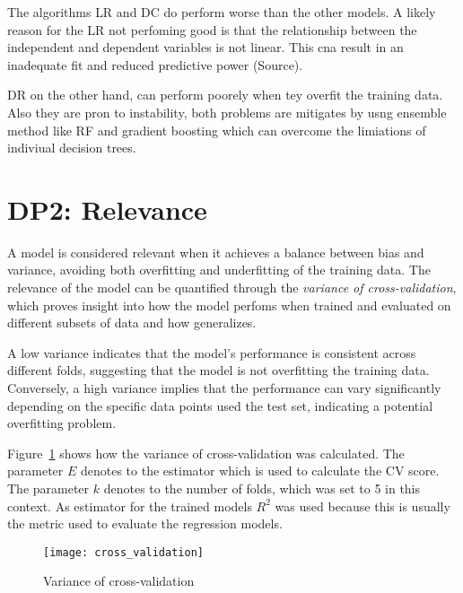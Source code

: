 
The algorithms \ac{LR} and {DC} do perform worse than the other models.
A likely reason for the \ac{LR} not perfoming good is that the relationship between the
independent and dependent variables is not linear. This cna result in an inadequate fit
and reduced predictive power (Source).

\ac{DR} on the other hand, can perform poorely when tey overfit the training data.
Also they are pron to instability, both problems are mitigates by usng ensemble method
like \ac{RF} and gradient boosting which can overcome the limiations of indiviual
decision trees.


\section{DP2: Relevance}\label{sec:relevance}

A model is considered relevant when it achieves a balance between bias and
variance, avoiding
both overfitting and underfitting of the training data.
The relevance of the model can be quantified through the \textit{variance of
cross-validation},
which proves insight into how the model perfoms when trained and evaluated on
different subsets
of data and how generalizes.

A low variance indicates that the model's performance is consistent across
different folds,
suggesting that the model is not overfitting the training data.
Conversely, a high variance implies that the performance can vary
significantly depending on the
specific data points used the test set, indicating a potential overfitting
problem.

Figure~\ref{fig:variance-of-cv} shows how the variance of cross-validation
was calculated.
The parameter $E$ denotes to the estimator which is used to calculate the
\ac{CV} score.
The parameter $k$ denotes to the number of folds, which was set to 5 in this
context.
As estimator for the trained models $R^2$ was used because this is usually
the metric used to
evaluate the regression models.

\begin{figure}[h]
\begin{tcolorbox}[arc=0pt,boxrule=0.5pt]
\centering
\texttt{[image: cross\_validation]}
\caption{Variance of cross-validation}
\label{fig:variance-of-cv}
\end{tcolorbox}
\end{figure}

